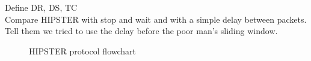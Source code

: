 \documentclass[10pt,onecolumn]{article}
\begin{document}
Define DR, DS, TC\\
Compare HIPSTER with stop and wait and with a simple delay between packets.\\
Tell them we tried to use the delay before the poor man's sliding window.
\begin{figure}[h]
  \centering
  \caption{HIPSTER protocol flowchart}
  \label{fig:flowchart}
\end{figure}
\end{document}
